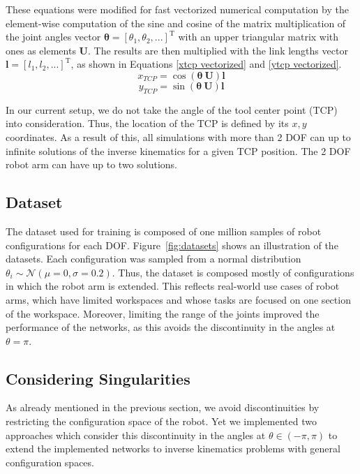 \documentclass[conference]{IEEEtran}
\begin{document}
These equations were modified for fast vectorized numerical computation by the element-wise computation of the sine and cosine of the matrix multiplication of the joint angles vector \( \bm{\theta} = \left[ \theta_1, \theta_2 , ... \right]^\text{T} \) with an upper triangular matrix with ones as elements \( \bm{U} \). The results are then multiplied with the link lengths vector \( \bm{l} = \left[ l_1, l_2, ... \right]^\text{T} \), as shown in Equations \ref{xtcp vectorized} and \ref{ytcp vectorized}.
\begin{equation}
    x_{TCP} = \cos \left( \bm{\theta}\ \bm{U} \right) \bm{l}
    \label{xtcp vectorized}
\end{equation}
\begin{equation}
    y_{TCP} = \sin \left( \bm{\theta}\ \bm{U} \right) \bm{l}
    \label{ytcp vectorized}
\end{equation}

In our current setup, we do not take the angle of the tool center point (TCP) into consideration. Thus, the location of the TCP is defined by its \( x, y \) coordinates. As a result of this, all simulations with more than 2 DOF can up to infinite solutions of the inverse kinematics for a given TCP position. The 2 DOF robot arm can have up to two solutions.

\subsection*{Dataset}

The dataset used for training is composed of one million samples of robot configurations for each DOF. Figure~\ref{fig:datasets} shows an illustration of the datasets. Each configuration was sampled from a normal distribution $ \theta_i \sim \mathcal{N}(\mu=0, \sigma=0.2) $. Thus, the dataset is composed mostly of configurations in which the robot arm is extended. This reflects real-world use cases of robot arms, which have limited workspaces and whose tasks are focused on one section of the workspace. Moreover, limiting the range of the joints improved the performance of the networks, as this avoids the discontinuity in the angles at \( \theta = \pi \).


\subsection*{Considering Singularities}

As already mentioned in the previous section, we avoid discontinuities by restricting the configuration space of the robot. Yet we implemented two approaches which consider this discontinuity in the angles at $\theta \in (- \pi , \pi)$ to extend the implemented networks to inverse kinematics problems with general configuration spaces.
\end{document}
